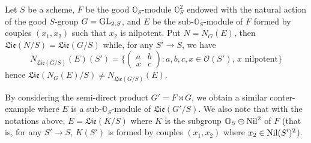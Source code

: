 \begin{example}\label{scheme group Lie and normalizer nonequal example}
Let $S$ be a scheme, $F$ be the good $\mathbb{O}_S$-module $\mathbb{O}_S^2$ endowed with the natural action of the good $S$-group $G=\mathrm{GL}_{2,S}$, and $E$ be the sub-$\mathbb{O}_S$-module of $F$ formed by couples $(x_1,x_2)$ such that $x_2$ is nilpotent. Put $N=N_G(E)$, then $\mathfrak{Lie}(N/S)=\mathfrak{Lie}(G/S)$ while, for any $S'\to S$, we have
\[N_{\mathfrak{Lie}(G/S)}(E)(S')=\Big\{\begin{pmatrix}
a&b\\
x&c
\end{pmatrix}:\text{$a,b,c,x\in\mathscr{O}(S')$, $x$ nilpotent}\Big\}\]
hence $\mathfrak{Lie}(N_G(E)/S)\neq N_{\mathfrak{Lie}(G/S)}(E)$.\par
By considering the semi-direct product $G'=F\rtimes G$, we obtain a similar conter-example where $E$ is a sub-$\mathbb{O}_S$-module of $\mathfrak{Lie}(G'/S)$. We also note that with the notations above, $E=\mathfrak{Lie}(K/S)$ where $K$ is the subgroup $\mathbb{O}_S\oplus\mathrm{Nil}^2$ of $F$ (that is, for any $S'\to S$, $K(S')$ is formed by couples $(x_1,x_2)$ where $x_2\in\mathrm{Nil}(S')^2$).
\end{example}
